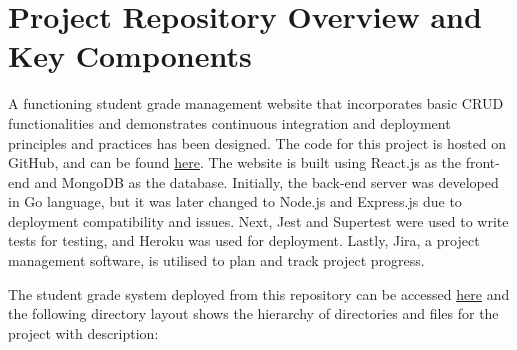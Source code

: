 \section{Project Repository Overview and Key Components}
A functioning student grade management website that incorporates basic CRUD functionalities and demonstrates continuous integration and deployment principles and practices has been designed. The code for this project is hosted on GitHub, and can be found \href{https://github.com/gabhang/final-year-project}{here}. The website is built using React.js as the front-end and MongoDB as the database. Initially, the back-end server was developed in Go language, but it was later changed to Node.js and Express.js due to deployment compatibility and issues. Next, Jest and Supertest were used to write tests for testing, and Heroku was used for deployment. Lastly, Jira, a project management software, is utilised to plan and track project progress.

The student grade system deployed from this repository can be accessed \href{https://student-grade-system.herokuapp.com/}{here} and the following directory layout shows the hierarchy of directories and files for the project with description:
\newline
{}

